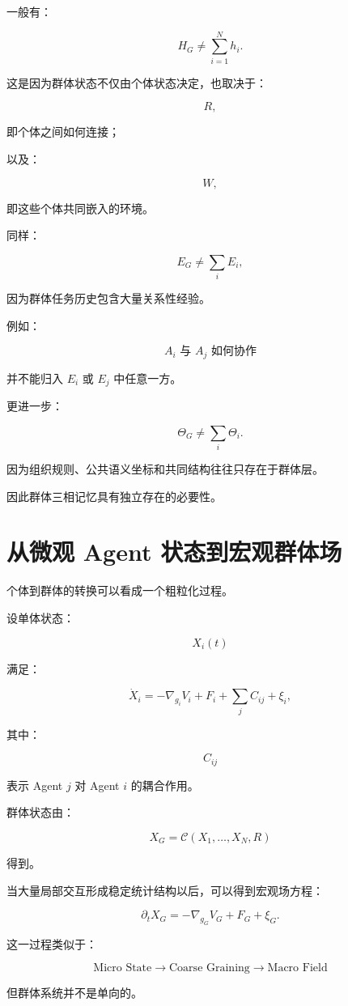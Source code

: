 一般有：

\[
H_G
\neq
\sum_{i=1}^{N}h_i.
\]

这是因为群体状态不仅由个体状态决定，也取决于：

\[
R,
\]

即个体之间如何连接；

以及：

\[
W,
\]

即这些个体共同嵌入的环境。

同样：

\[
E_G
\neq
\sum_i E_i,
\]

因为群体任务历史包含大量关系性经验。

例如：

\[
A_i
\text{ 与 }
A_j
\text{ 如何协作}
\]

并不能归入 $E_i$ 或 $E_j$ 中任意一方。

更进一步：

\[
\Theta_G
\neq
\sum_i\Theta_i.
\]

因为组织规则、公共语义坐标和共同结构往往只存在于群体层。

因此群体三相记忆具有独立存在的必要性。


\section{从微观 Agent 状态到宏观群体场}

个体到群体的转换可以看成一个粗粒化过程。

设单体状态：

\[
X_i(t)
\]

满足：

\[
\dot X_i
=
-\nabla_{g_i}V_i
+
F_i
+
\sum_j C_{ij}
+
\xi_i,
\]

其中：

\[
C_{ij}
\]

表示 Agent $j$ 对 Agent $i$ 的耦合作用。

群体状态由：

\[
X_G
=
\mathcal{C}
\left(
X_1,
\dots,
X_N,
R
\right)
\]

得到。

当大量局部交互形成稳定统计结构以后，可以得到宏观场方程：

\[
\partial_t X_G
=
-\nabla_{g_G}V_G
+
F_G
+
\xi_G.
\]

这一过程类似于：

\[
\boxed{
\text{Micro State}
\rightarrow
\text{Coarse Graining}
\rightarrow
\text{Macro Field}
}
\]

但群体系统并不是单向的。

